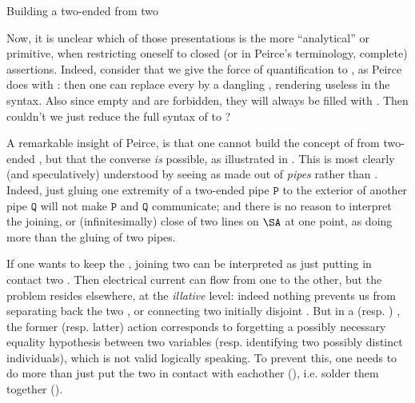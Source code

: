\begin{scope}
\begin{scope}
\begin{marginfigure}
  \begin{center}
  \end{center}
  \caption{Building a two-ended  from two }
\end{marginfigure}

Now, it is unclear which of those presentations is the more ``analytical'' or
primitive, when restricting oneself to closed (or in Peirce's terminology,
complete) assertions. Indeed, consider that we give the force of quantification
to , as Peirce does with : then one can replace every  by a
dangling , rendering  useless in the syntax. Also since empty 
and  are forbidden, they will always be filled with . Then
couldn't we just reduce the full syntax of  to ?

A remarkable insight of Peirce, is that one cannot build the concept of
 from two-ended , but that the converse \emph{is}
possible, as illustrated in . This is most clearly (and
speculatively) understood by seeing  as made out of \emph{pipes} rather
than . Indeed, just gluing one extremity of a two-ended pipe
$\mathtt{P}$ to the exterior of another pipe $\mathtt{Q}$ will not make
$\mathtt{P}$ and $\mathtt{Q}$ communicate; and there is no reason to interpret
the joining, or (infinitesimally) close  of two lines on $\SA$
at one point, as doing more than the gluing of two pipes.

\begin{digression}
  If one wants to keep the  , joining two  can be
interpreted as just putting in contact two . Then electrical current
can flow from one  to the other, but the problem resides elsewhere, at
the \emph{illative} level: indeed nothing prevents us from separating back the
two , or connecting two initially disjoint . But in a
 (resp. ) , the former (resp. latter)
action corresponds to forgetting a possibly necessary equality hypothesis
between two variables (resp. identifying two possibly distinct individuals),
which is not valid logically speaking. To prevent this, one needs to do more
than just put the two  in contact with eachother (),
i.e. solder them together ().
\end{digression}


\end{scope}
\end{scope}
